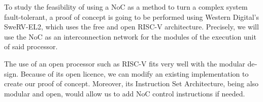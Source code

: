 \begin{otherlanguage}{english}
To study the feasibility of using a NoC as a method to turn a complex system fault-tolerant, a proof of concept is going to be performed using Western Digital's SweRV-EL2, which uses the free and open RISC-V architecture. Precisely, we will use the NoC as an interconnection network for the modules of the execution unit of said processor.

The use of an open processor such as RISC-V fits very well with the modular design. Because of its open licence, we can modify an existing implementation to create our proof of concept. Moreover, its Instruction Set Architecture, being also modular and open, would allow us to add NoC control instructions if needed.
\end{otherlanguage}
